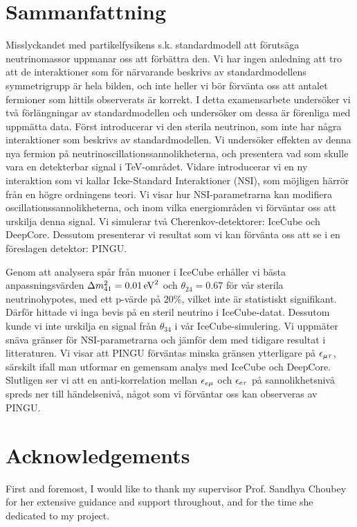 \chapter*{Sammanfattning}
Misslyckandet med partikelfysikens s.k. standardmodell att förutsäga neutrinomassor uppmanar oss att förbättra den. Vi har ingen anledning att tro att
de interaktioner som för närvarande beskrivs av standardmodellens symmetrigrupp är hela bilden, och inte heller vi bör förvänta oss att antalet fermioner som hittils observerats
är korrekt.
I detta examensarbete undersöker vi två förlängningar av standardmodellen och undersöker om dessa är förenliga med uppmätta data.
Först introducerar vi den sterila neutrinon, som inte har några interaktioner som beskrivs av standardmodellen. Vi undersöker effekten av denna
nya fermion på neutrinoscillationssannolikheterna, och presentera vad som skulle vara en detekterbar signal i \si{\TeV}-området.
Vidare introducerar vi en ny interaktion som vi kallar Icke-Standard Interaktioner (NSI), som möjligen härrör från en högre ordningens teori.
Vi visar hur NSI-parametrarna kan modifiera oscillationssannolikheterna, och inom vilka energiområden vi förväntar oss att urskilja denna signal.
Vi simulerar två Cherenkov-detektorer: IceCube och DeepCore. Dessutom presenterar vi resultat som vi
kan förvänta oss att se i en föreslagen detektor: PINGU.

Genom att analysera spår från muoner i IceCube erhåller vi bästa anpassningsvärden $\dm[41] = \SI{0.01}{\eV^2}$ och $\theta_{24} = 0.67$ för vår sterila neutrinohypotes, med
ett p-värde på $20\%$, vilket inte är statistiskt signifikant. Därför hittade vi inga bevis på en steril neutrino i IceCube-datat.
Dessutom kunde vi inte urskilja en signal från $\theta_{34}$ i vår IceCube-simulering.
Vi uppmäter snäva gränser för NSI-parametrarna och jämför dem med tidigare resultat i litteraturen. Vi visar att PINGU förväntas minska gränsen ytterligare
på $\epsilon_{\mu\tau}$, särskilt ifall man utformar en gemensam analys med IceCube och DeepCore. Slutligen ser vi att en anti-korrelation mellan
$\epsilon_{e\mu}$ och $\epsilon_{e\tau}$ på sannolikhetsnivå spreds ner till händelsenivå, något som vi förväntar oss kan observeras av PINGU.


\chapter*{Acknowledgements}
First and foremost, I would like to thank my supervisor Prof. Sandhya Choubey for her extensive guidance and support throughout,
and for the time she dedicated to my project. 


